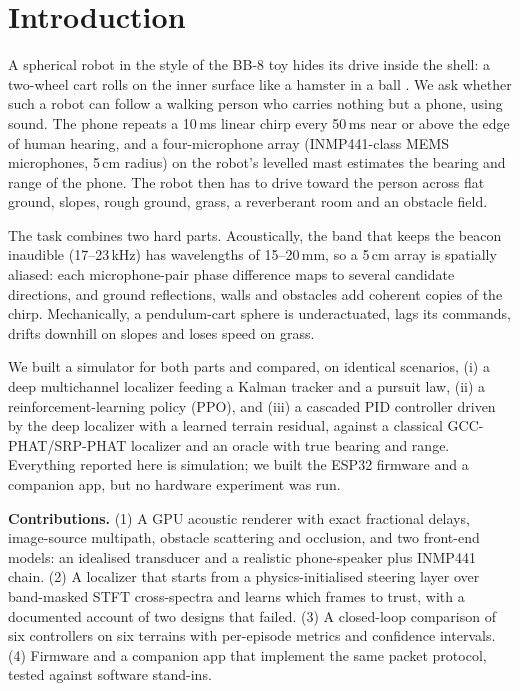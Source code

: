 \section{Introduction}

A spherical robot in the style of the BB-8 toy hides its drive inside the shell: a two-wheel
cart rolls on the inner surface like a hamster in a ball \cite{chase2012spherical,halme1996spherical}.
We ask whether such a robot can follow a walking person who carries nothing but a phone, using
sound. The phone repeats a 10\,ms linear chirp every 50\,ms near or above the edge of human
hearing, and a four-microphone array (INMP441-class MEMS microphones, 5\,cm radius) on the
robot's levelled mast estimates the bearing and range of the phone. The robot then has to
drive toward the person across flat ground, slopes, rough ground, grass, a reverberant room
and an obstacle field.

The task combines two hard parts. Acoustically, the band that keeps the beacon inaudible
(17--23\,kHz) has wavelengths of 15--20\,mm, so a 5\,cm array is spatially aliased: each
microphone-pair phase difference maps to several candidate directions, and ground reflections,
walls and obstacles add coherent copies of the chirp. Mechanically, a pendulum-cart sphere
is underactuated, lags its commands, drifts downhill on slopes and loses speed on grass.

We built a simulator for both parts and compared, on identical scenarios, (i) a deep
multichannel localizer feeding a Kalman tracker and a pursuit law, (ii) a reinforcement-learning
policy (PPO), and (iii) a cascaded PID controller driven by the deep localizer with a learned
terrain residual, against a classical GCC-PHAT/SRP-PHAT localizer \cite{knapp1976gcc,dibiase2001srp}
and an oracle with true bearing and range. Everything reported here is simulation;
we built the ESP32 firmware and a companion app, but no hardware experiment was run.

\textbf{Contributions.} (1) A GPU acoustic renderer with exact fractional delays, image-source
multipath, obstacle scattering and occlusion, and two front-end models: an idealised transducer
and a realistic phone-speaker plus INMP441 chain. (2) A localizer that starts from a
physics-initialised steering layer over band-masked STFT cross-spectra and learns which frames
to trust, with a documented account of two designs that failed. (3) A closed-loop comparison of
six controllers on six terrains with per-episode metrics and confidence intervals. (4) Firmware
and a companion app that implement the same packet protocol, tested against software stand-ins.

